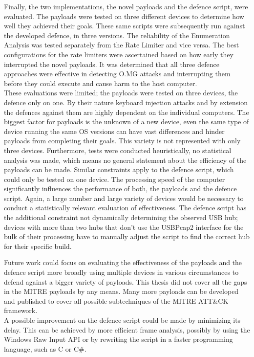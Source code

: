 Finally, the two implementations, the novel payloads and the defence script, were evaluated. The payloads were tested on three different devices to determine how well they achieved their goals. These same scripts were subsequently run against the developed defence, in three versions. The reliability of the Enumeration Analysis was tested separately from the Rate Limiter and vice versa. The best configurations for the rate limiters were ascertained based on how early they interrupted the novel payloads. It was determined that all three defence approaches were effective in detecting O.MG attacks and interrupting them before they could execute and cause harm to the host computer. \\

These evaluations were limited; the payloads were tested on three devices, the defence only on one. By their nature keyboard injection attacks and by extension the defences against them are highly dependent on the individual computers. The biggest factor for payloads is the unknown of a new device, even the same type of device running the same OS versions can have vast differences and hinder payloads from completing their goals. This variety is not represented with only three devices. Furthermore, tests were conducted heuristically, no statistical analysis was made, which means no general statement about the efficiency of the payloads can be made. Similar constraints apply to the defence script, which could only be tested on one device. The processing speed of the computer significantly influences the performance of both, the payloads and the defence script. Again, a large number and large variety of devices would be necessary to conduct a statistically relevant evaluation of effectiveness. The defence script has the additional constraint not dynamically determining the observed USB hub; devices with more than two hubs that don't use the USBPcap2 interface for the bulk of their processing have to manually adjust the script to find the correct hub for their specific build. 

Future work could focus on evaluating the effectiveness of the payloads and the defence script more broadly using multiple devices in various circumstances to defend against a bigger variety of payloads. This thesis did not cover all the gaps in the MITRE payloads by any means. Many more payloads can be developed and published to cover all possible subtechniques of the MITRE ATT\&CK framework. \\
A possible improvement on the defence script could be made by minimizing its delay. This can be achieved by more efficient frame analysis, possibly by using the Windows Raw Input API or by rewriting the script in a faster programming language, such as C or C\#.







